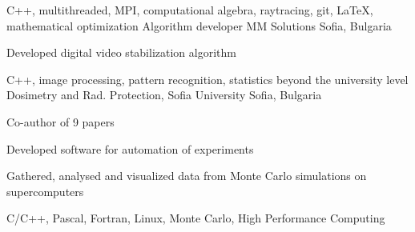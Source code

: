 {C++, multithreaded, MPI, computational algebra, raytracing, git, \LaTeX, mathematical optimization}
{Algorithm developer}
{MM Solutions}
{Sofia, Bulgaria}
{ \item Developed digital video stabilization algorithm}
{C++, image processing, pattern recognition, statistics beyond the university level}
{Dosimetry and Rad. Protection, Sofia University} {Sofia, Bulgaria}
{
 \item Co-author of 9 papers
 \item Developed software for automation of experiments
}
{ 
 \item Gathered, analysed and visualized data from Monte Carlo simulations on supercomputers
}
{C/C++, Pascal, Fortran, Linux, Monte Carlo, High Performance Computing}
